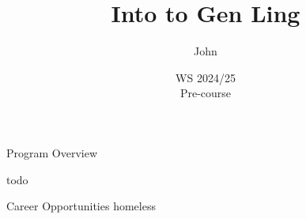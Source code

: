 \documentclass[aspectratio=169,hyperref={unicode}]{beamer}
\title{Into to Gen Ling}
\author{John}
\institute{Fachschaft General \& Computational Linguistics\\ \textbf{University of Tübingen}}
\date{WS 2024/25 \\ Pre-course}
\begin{document}
\frame{\titlepage}

\begin{frame}{Program Overview}

todo
\end{frame}

\begin{frame}{Career Opportunities}
homeless
\end{frame}
\end{document}
